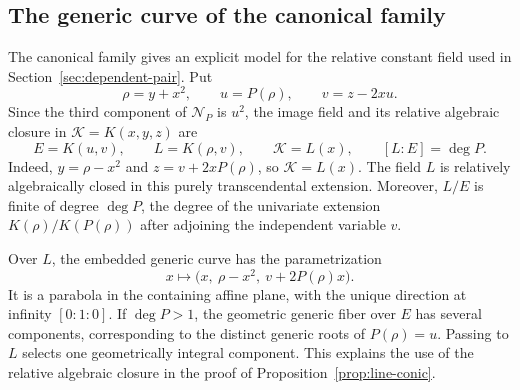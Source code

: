 \documentclass[11pt,reqno]{amsart}
\theoremstyle{definition}
\theoremstyle{remark}
\numberwithin{equation}{section}
\newcommand{\Ncal}{\mathcal N}
\begin{document}


\subsection{The generic curve of the canonical family}\label{subsec:canonical-curve}
The canonical family gives an explicit model for the relative constant field used in Section~\ref{sec:dependent-pair}. Put
\[
 \rho=y+x^2,\qquad u=P(\rho),\qquad v=z-2xu.
\]
Since the third component of $\Ncal_P$ is $u^2$, the image field and its relative algebraic closure in $\mathcal K=K(x,y,z)$ are
\begin{equation}\label{eq:canonical-fields}
 E=K(u,v),\qquad L=K(\rho,v),\qquad \mathcal K=L(x),\qquad [L:E]=\deg P.
\end{equation}
Indeed, $y=\rho-x^2$ and $z=v+2xP(\rho)$, so $\mathcal K=L(x)$. The field $L$ is relatively algebraically closed in this purely transcendental extension. Moreover, $L/E$ is finite of degree $\deg P$, the degree of the univariate extension $K(\rho)/K(P(\rho))$ after adjoining the independent variable $v$.

Over $L$, the embedded generic curve has the parametrization
\begin{equation}\label{eq:canonical-conic}
 x\longmapsto\bigl(x,\ \rho-x^2,\ v+2P(\rho)x\bigr).
\end{equation}
It is a parabola in the containing affine plane, with the unique direction at infinity $[0:1:0]$. If $\deg P>1$, the geometric generic fiber over $E$ has several components, corresponding to the distinct generic roots of $P(\rho)=u$. Passing to $L$ selects one geometrically integral component. This explains the use of the relative algebraic closure in the proof of Proposition~\ref{prop:line-conic}.
\end{document}
